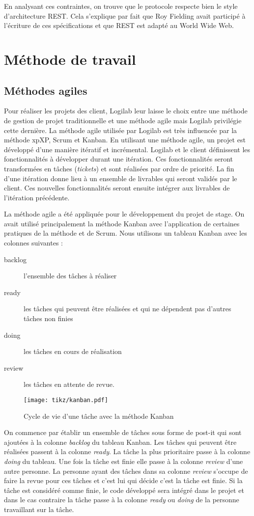 En analysant ces contraintes, on trouve que le protocole  respecte bien le style d'architecture REST. Cela s'explique par fait que Roy Fielding avait participé à l'écriture de ces spécifications et que REST est adapté au World Wide Web.  
 
\section{Méthode de travail}
\subsection{Méthodes agiles}
Pour réaliser les projets des client, Logilab leur laisse le choix entre une méthode de gestion de projet traditionnelle et une méthode agile mais Logilab privilégie cette dernière. La méthode agile utilisée par Logilab est très influencée par la méthode \gls{xp}{XP}, Scrum et Kanban. En utilisant une méthode agile, un projet est développé d'une manière itératif et incrémental. Logilab et le client définissent les fonctionnalités à développer durant une itération. Ces fonctionnalités seront transformées en tâches (\textit{tickets}) et sont réalisées par ordre de priorité. La fin d'une itération donne lieu à un ensemble de livrables qui seront validés par le client. Ces nouvelles fonctionnalités seront ensuite intégrer aux livrables de l'itération précédente.

La méthode agile a été appliquée pour le développement du projet de stage. On avait utilisé principalement la méthode Kanban avec l'application de certaines pratiques de la méthode  et de Scrum. Nous utilisons un tableau Kanban avec les colonnes suivantes : 
\begin{description}
	\item[backlog] l'ensemble des tâches à réaliser
	\item[ready] les tâches qui peuvent être réalisées et qui ne dépendent pas d'autres tâches non finies
	\item[doing] les tâches en cours de réalisation
	\item[review] les tâches en attente de revue.
\end{description}
\begin{figure}
\centering
  \texttt{[image: tikz/kanban.pdf]}
  \caption{Cycle de vie d'une tâche avec la méthode Kanban}
  \label{fig:rest}
\end{figure}
On commence par établir un ensemble de tâches sous forme de post-it qui sont ajoutées à la colonne \textit{backlog} du tableau Kanban. Les tâches qui peuvent être réalisées passent à la colonne \textit{ready}. La tâche la plus prioritaire passe à la colonne \textit{doing} du tableau. Une fois la tâche est finie elle passe à la colonne \textit{review} d'une autre personne. La personne ayant des tâches dans sa colonne \textit{review} s'occupe de faire la revue pour ces tâches et c'est lui qui décide c'est la tâche est finie. Si la tâche est considéré comme finie, le code développé sera intégré dans le projet et dans le cas contraire la tâche passe à la colonne \textit{ready} ou \textit{doing} de la personne travaillant sur la tâche. 


